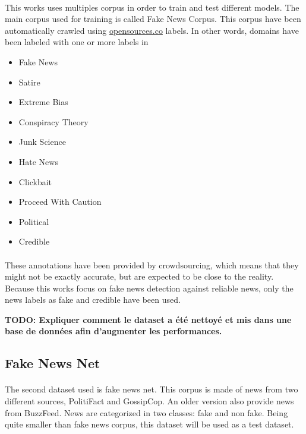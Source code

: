 \paragraph{}
This works uses multiples corpus in order to train and test different models. The main corpus used for training is called Fake News Corpus\cite{Szpakowski}. This corpus have been automatically crawled using \url{opensources.co} labels. In other words, domains have been labeled with one or more labels in \begin{itemize}
	\item Fake News
	\item Satire
	\item Extreme Bias
	\item Conspiracy Theory
	\item Junk Science
	\item Hate News
	\item Clickbait
	\item Proceed With Caution
	\item Political
	\item Credible
\end{itemize}
\paragraph{}
These annotations have been provided by crowdsourcing, which means that they might not be exactly accurate, but are expected to be close to the reality. Because this works focus on fake news detection against reliable news, only the news labels as fake and credible have been used. 

\textbf{TODO: Expliquer comment le dataset a été nettoyé et mis dans une base de données afin d'augmenter les performances. }

\subsection{Fake News Net}
\paragraph{}
The second dataset used is fake news net\cite{shu2018fakenewsnet,shu2017exploiting,shu2017fake}. This corpus is made of news from two different sources, PolitiFact and GossipCop. An older version also provide news from BuzzFeed. News are categorized in two classes: fake and non fake. Being quite smaller than fake news corpus, this dataset will be used as a test dataset. 

